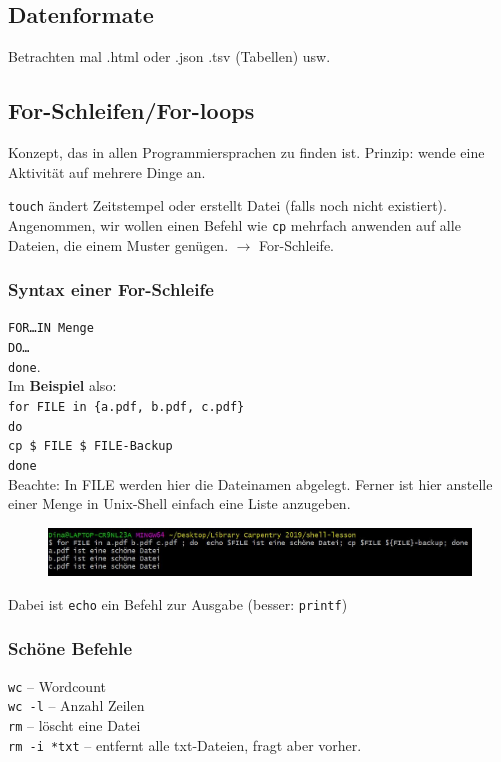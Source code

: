 \documentclass[11pt, a4paper, german]{article}
\begin{document}
\subsection{Datenformate}
Betrachten mal .html oder .json .tsv (Tabellen) usw. 

\subsection{For-Schleifen/For-loops}
Konzept, das in allen Programmiersprachen zu finden ist. Prinzip: wende eine Aktivität auf mehrere Dinge an. 

\texttt{touch} ändert Zeitstempel oder erstellt Datei (falls noch nicht existiert). Angenommen, wir wollen einen Befehl wie \texttt{cp} mehrfach anwenden auf alle Dateien, die einem Muster genügen. $\rightarrow$ For-Schleife.

\subsubsection*{Syntax einer For-Schleife}
\noindent\texttt{FOR\dots IN Menge}\\
\texttt{DO\dots}\\
\texttt{done}.\\

Im \textbf{Beispiel} also:\\
\texttt{for FILE in \{a.pdf, b.pdf, c.pdf\}}\\
\texttt{do}\\
\texttt{cp \$ FILE \$ FILE-Backup}\\
\texttt{done}\\

Beachte: In FILE werden hier die Dateinamen abgelegt. Ferner ist hier anstelle einer Menge in Unix-Shell einfach eine Liste anzugeben. \\

\begin{figure}[h]
	\centering
	\includegraphics[width=\linewidth]{bild2}
	\caption{}
	\label{fig:bild1}
\end{figure}

Dabei ist \texttt{echo} ein Befehl zur Ausgabe (besser: \texttt{printf})

\subsubsection{Schöne Befehle}
\texttt{wc} -- Wordcount\\
\texttt{wc -l} -- Anzahl Zeilen\\
\texttt{rm} -- löscht eine Datei\\
\texttt{rm -i *txt} -- entfernt alle txt-Dateien, fragt aber vorher.\\
\end{document}
